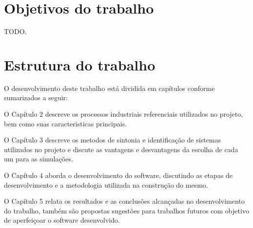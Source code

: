 \section{Objetivos do trabalho}

    TODO.

\section{Estrutura do trabalho}

    O desenvolvimento deste trabalho está dividida em capítulos conforme sumarizados
    a seguir:

    O Capítulo 2 descreve os processos industriais referenciais utilizados no projeto,
    bem como suas caracteristicas principais.
    
    O Capítulo 3 descreve os metodos de sintonia e identificação de sistemas utilizados
    no projeto e discute as vantagens e desvantagens da escolha de cada um para as
    simulações.
    
    O Capítulo 4 aborda o desenvolvimento do software, discutindo as etapas de
    desenvolvimento e a metodologia utilizada na construção do mesmo.
    
    O Capítulo 5 relata os resultados e as conclusões alcançadas no desenvolvimento do
    trabalho, também são propostas sugestões para trabalhos futuros com objetivo de
    aperfeiçoar o software desenvolvido.

